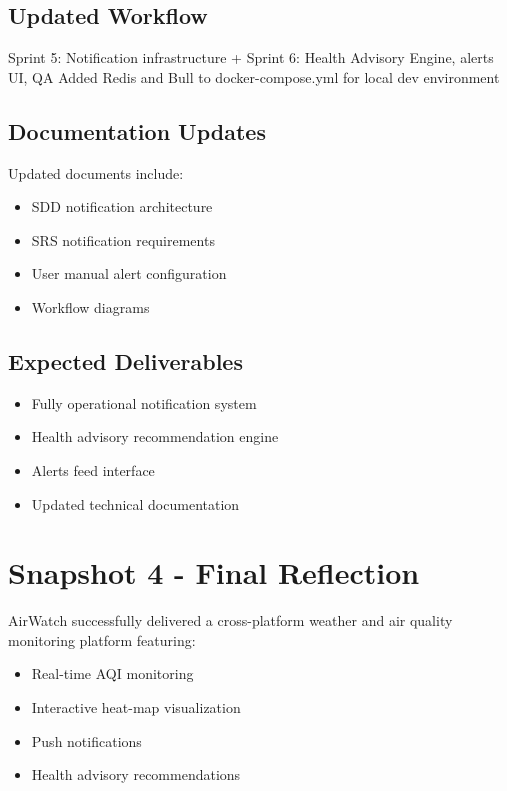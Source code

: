 \documentclass[12pt]{article}
\begin{document}
\subsection {Updated Workflow}
Sprint 5: Notification infrastructure + Sprint 6: Health Advisory Engine, alerts UI, QA
Added Redis and Bull to docker-compose.yml for local dev environment

\subsection{Documentation Updates}

Updated documents include:

\begin{itemize}
    \item SDD notification architecture
    \item SRS notification requirements
    \item User manual alert configuration
    \item Workflow diagrams
\end{itemize}

\subsection{Expected Deliverables}

\begin{itemize}
    \item Fully operational notification system
    \item Health advisory recommendation engine
    \item Alerts feed interface
    \item Updated technical documentation
\end{itemize}
\newpage
\section{Snapshot 4 - Final Reflection}

AirWatch successfully delivered a cross-platform weather
and air quality monitoring platform featuring:

\begin{itemize}
    \item Real-time AQI monitoring
    \item Interactive heat-map visualization
    \item Push notifications
    \item Health advisory recommendations
\end{itemize}
\end{document}
